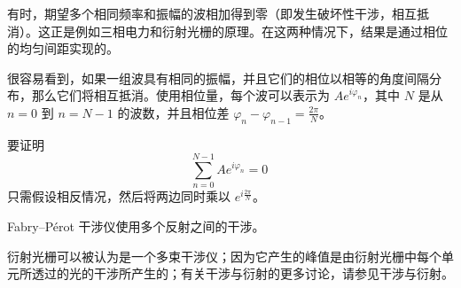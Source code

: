 有时，期望多个相同频率和振幅的波相加得到零（即发生破坏性干涉，相互抵消）。这正是例如三相电力和衍射光栅的原理。在这两种情况下，结果是通过相位的均匀间距实现的。

很容易看到，如果一组波具有相同的振幅，并且它们的相位以相等的角度间隔分布，那么它们将相互抵消。使用相位量，每个波可以表示为 \( Ae^{i\varphi_n} \)，其中 \( N \) 是从 \( n = 0 \) 到 \( n = N-1 \) 的波数，并且相位差 \( \varphi_n - \varphi_{n-1} = \frac{2\pi}{N} \)。

要证明
\[
\sum_{n=0}^{N-1} A e^{i\varphi_n} = 0~
\]
只需假设相反情况，然后将两边同时乘以 \( e^{i \frac{2\pi}{N}} \)。

Fabry–Pérot 干涉仪使用多个反射之间的干涉。

衍射光栅可以被认为是一个多束干涉仪；因为它产生的峰值是由衍射光栅中每个单元所透过的光的干涉所产生的；有关干涉与衍射的更多讨论，请参见干涉与衍射。
